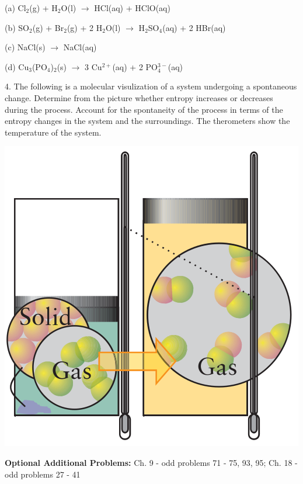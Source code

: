 \documentclass[11pt]{article}
\begin{document}
(a) Cl$_2$(g) + H$_2$O(l) $\rightarrow$ HCl(aq) + HClO(aq)

(b) SO$_2$(g) + Br$_2$(g) + 2 H$_2$O(l) $\rightarrow$ H$_2$SO$_4$(aq) + 2 HBr(aq)

(c) NaCl(s) $\rightarrow$ NaCl(aq)

(d) Cu$_3$(PO$_4$)$_2$(s) $\rightarrow$ 3 Cu$^{2+}$(aq) + 2 PO$_4^{3-}$(aq)

\vspace{1in}

4. The following is a molecular visulization of a system undergoing a spontaneous
change. Determine from the picture whether entropy increases or decreases during the
process. Account for the spontaneity of the process in terms of the entropy changes
in the system and the surroundings. The therometers show the temperature of the
system.

\begin{center}
  \includegraphics[scale=0.33]{entropy.png}
\end{center}


\vfill
\textbf{Optional Additional Problems:} Ch. 9 - odd problems 71 - 75, 93, 95; Ch. 18
- odd problems 27 - 41
\end{document}
